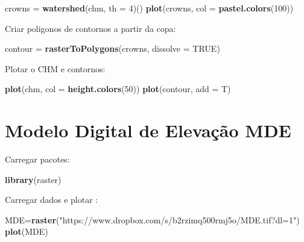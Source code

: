 \documentclass[
]{book}
\newenvironment{Shaded}{\begin{snugshade}}{\end{snugshade}}
\newcommand{\DataTypeTok}[1]{\textcolor[rgb]{0.13,0.29,0.53}{#1}}
\newcommand{\DecValTok}[1]{\textcolor[rgb]{0.00,0.00,0.81}{#1}}
\newcommand{\KeywordTok}[1]{\textcolor[rgb]{0.13,0.29,0.53}{\textbf{#1}}}
\newcommand{\NormalTok}[1]{#1}
\newcommand{\OtherTok}[1]{\textcolor[rgb]{0.56,0.35,0.01}{#1}}
\newcommand{\StringTok}[1]{\textcolor[rgb]{0.31,0.60,0.02}{#1}}
\begin{document}
\begin{Shaded}
\begin{Highlighting}[]
\NormalTok{crowns =}\StringTok{ }\KeywordTok{watershed}\NormalTok{(chm, }\DataTypeTok{th =} \DecValTok{4}\NormalTok{)()}
\KeywordTok{plot}\NormalTok{(crowns, }\DataTypeTok{col =} \KeywordTok{pastel.colors}\NormalTok{(}\DecValTok{100}\NormalTok{))}
\end{Highlighting}
\end{Shaded}

Criar poligonos de contornos a partir da copa:

\begin{Shaded}
\begin{Highlighting}[]
\NormalTok{contour =}\StringTok{ }\KeywordTok{rasterToPolygons}\NormalTok{(crowns, }\DataTypeTok{dissolve =} \OtherTok{TRUE}\NormalTok{)}
\end{Highlighting}
\end{Shaded}

Plotar o CHM e contornos:

\begin{Shaded}
\begin{Highlighting}[]
\KeywordTok{plot}\NormalTok{(chm, }\DataTypeTok{col =} \KeywordTok{height.colors}\NormalTok{(}\DecValTok{50}\NormalTok{))}
\KeywordTok{plot}\NormalTok{(contour, }\DataTypeTok{add =}\NormalTok{ T)}
\end{Highlighting}
\end{Shaded}

\hypertarget{modelo-digital-de-elevauxe7uxe3o-mde}{%
\section{Modelo Digital de Elevação MDE}\label{modelo-digital-de-elevauxe7uxe3o-mde}}

Carregar pacotes:

\begin{Shaded}
\begin{Highlighting}[]
\KeywordTok{library}\NormalTok{(raster)}
\end{Highlighting}
\end{Shaded}

Carregar dados e plotar :

\begin{Shaded}
\begin{Highlighting}[]
\NormalTok{MDE=}\KeywordTok{raster}\NormalTok{(}\StringTok{"https://www.dropbox.com/s/b2rzimq500rmj5o/MDE.tif?dl=1"}\NormalTok{)}
\KeywordTok{plot}\NormalTok{(MDE)}
\end{Highlighting}
\end{Shaded}
\end{document}
